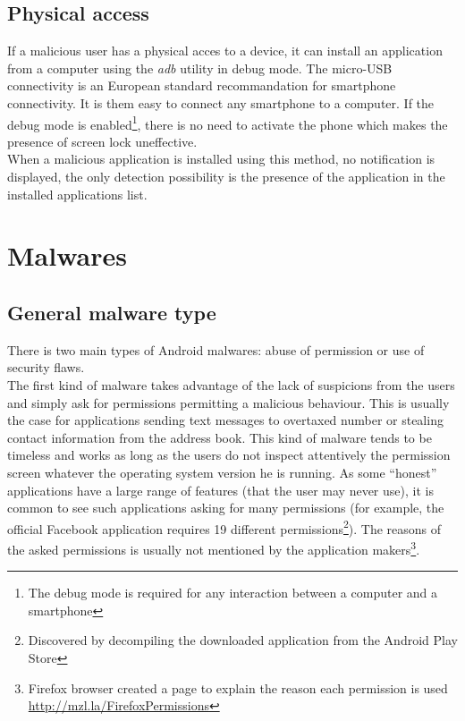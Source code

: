 \subsection{Physical access}

If a malicious user has a physical acces to a device, it can install an application from a computer using the \emph{adb} utility in debug mode.
The micro-USB connectivity is an European standard recommandation for smartphone connectivity.
It is them easy to connect any smartphone to a computer.
If the debug mode is enabled\footnote{The debug mode is required for any interaction between a computer and a smartphone}, there is no need to activate the phone which makes the presence of screen lock uneffective.\\

When a malicious application is installed using this method, no notification is displayed, the only detection possibility is the presence of the application in the installed applications list.

\section{Malwares}

\subsection{General malware type}
\label{sec:malware-type}


There is two main types of Android malwares: abuse of permission or use of security flaws.\\

The first kind of malware takes advantage of the lack of suspicions from the users and simply ask for permissions permitting a malicious behaviour.
This is usually the case for applications sending text messages to overtaxed number or stealing contact information from the address book.
This kind of malware tends to be timeless and works as long as the users do not inspect attentively the permission screen whatever the operating system version he is running.
As some ``honest'' applications have a large range of features (that the user may never use), it is common to see such applications asking for many permissions (for example, the official Facebook application requires 19 different permissions\footnote{Discovered by decompiling the downloaded application from the Android Play Store}).
The reasons of the asked permissions is usually not mentioned by the application makers\footnote{Firefox browser created a page to explain the reason each permission is used \url{http://mzl.la/FirefoxPermissions}}.

